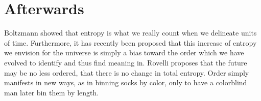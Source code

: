 

\graphicspath{{6/figures/}} %



\chapter{\label{}Afterwards}


Boltzmann showed that entropy is what we really count when we delineate units of time. Furthermore, it has recently been proposed \citep{connes1994neumann} that this increase of entropy we envision for the universe is simply a bias toward the order which we have evolved to identify and thus find meaning in. Rovelli proposes that the future may be no less ordered, that there is no change in total entropy. Order simply manifests in new ways, as in binning socks by color, only to have a colorblind man later bin them by length.

